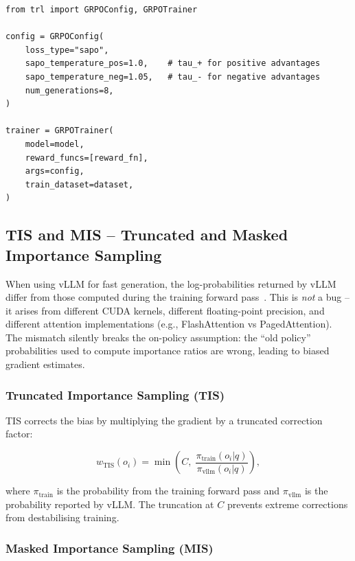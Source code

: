\begin{examplebox}
\begin{lstlisting}[style=pythonstyle]
from trl import GRPOConfig, GRPOTrainer

config = GRPOConfig(
    loss_type="sapo",
    sapo_temperature_pos=1.0,    # tau_+ for positive advantages
    sapo_temperature_neg=1.05,   # tau_- for negative advantages
    num_generations=8,
)

trainer = GRPOTrainer(
    model=model,
    reward_funcs=[reward_fn],
    args=config,
    train_dataset=dataset,
)
\end{lstlisting}
\end{examplebox}

\subsection{TIS and MIS -- Truncated and Masked Importance Sampling}
\label{sec:tis-mis}

\begin{warningbox}
When using vLLM for fast generation, the log-probabilities returned by vLLM differ from those computed during the training forward pass~\cite{zhong2025tismis}. This is \emph{not} a bug -- it arises from different CUDA kernels, different floating-point precision, and different attention implementations (e.g., FlashAttention vs PagedAttention). The mismatch silently breaks the on-policy assumption: the ``old policy'' probabilities used to compute importance ratios are wrong, leading to biased gradient estimates.
\end{warningbox}

\subsubsection*{Truncated Importance Sampling (TIS)}
\label{truncated-importance-sampling-tis}

TIS corrects the bias by multiplying the gradient by a truncated correction factor:

\[
\boxed{
    w_{\text{TIS}}(o_i) = \min\!\left(C,\; \frac{\pi_{\text{train}}(o_i|q)}{\pi_{\text{vllm}}(o_i|q)}\right),
  }
\]

where $\pi_{\text{train}}$ is the probability from the training forward pass and $\pi_{\text{vllm}}$ is the probability reported by vLLM. The truncation at $C$ prevents extreme corrections from destabilising training.

\subsubsection*{Masked Importance Sampling (MIS)}
\label{masked-importance-sampling-mis}

